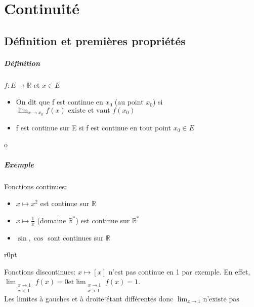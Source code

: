 \chapter{Continuité}
\section{Définition et premières propriétés}

\paragraph{Définition} $f:E \rightarrow \mathbb{R}$ et $x \in E$ \\
\begin{itemize}
	\item On dit que f est continue en $x_0$ (au point $x_0$) si $\displaystyle \lim_{x\to x_0} f(x) \text{ existe et vaut }f(x_0)$
	\item f est continue sur E si f est continue en tout point $x_0 \in E$
\end{itemize}
o
\paragraph{Exemple} 
Fonctions continues:
\begin{itemize}
	\item $x \mapsto x^2$ est continue sur $\mathbb{R}$
	\item $x \mapsto \frac{1}{x}$ (domaine $\mathbb{R}^*$) est continue sur $\mathbb{R}^*$
	\item $\sin, \cos$ sont continues sur $\mathbb{R}$
\end{itemize}

\begin{wrapfigure}[5]{r}{0pt}
\end{wrapfigure}
Fonctions discontinues:
$x \mapsto [x]$ n'est pas continue en 1 par exemple. En effet, $\displaystyle \lim_{\substack{x\to 1 \\ x<1}} f(x) = 0 \text{et} \lim_{\substack{x\to 1 \\  x>1}} f(x) = 1$.~\\
Les limites à gauches et à droite étant différentes donc $\lim_{x\to 1} \text{ n'existe pas }$


